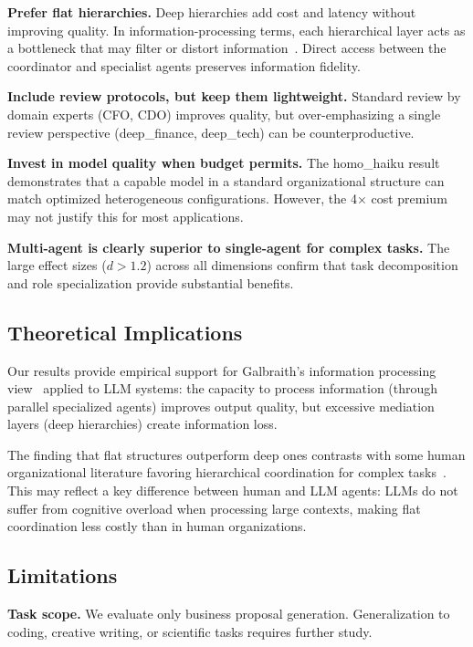 \documentclass[conference]{IEEEtran}
\begin{document}
\textbf{Prefer flat hierarchies.}
Deep hierarchies add cost and latency without improving quality.
In information-processing terms, each hierarchical layer acts as a bottleneck that may filter or distort information~\cite{galbraith1974designing}.
Direct access between the coordinator and specialist agents preserves information fidelity.

\textbf{Include review protocols, but keep them lightweight.}
Standard review by domain experts (CFO, CDO) improves quality, but over-emphasizing a single review perspective (deep\_finance, deep\_tech) can be counterproductive.

\textbf{Invest in model quality when budget permits.}
The homo\_haiku result demonstrates that a capable model in a standard organizational structure can match optimized heterogeneous configurations.
However, the 4$\times$ cost premium may not justify this for most applications.

\textbf{Multi-agent is clearly superior to single-agent for complex tasks.}
The large effect sizes ($d > 1.2$) across all dimensions confirm that task decomposition and role specialization provide substantial benefits.

\subsection{Theoretical Implications}

Our results provide empirical support for Galbraith's information processing view~\cite{galbraith1974designing} applied to LLM systems: the capacity to process information (through parallel specialized agents) improves output quality, but excessive mediation layers (deep hierarchies) create information loss.

The finding that flat structures outperform deep ones contrasts with some human organizational literature favoring hierarchical coordination for complex tasks~\cite{mintzberg1979structuring}.
This may reflect a key difference between human and LLM agents: LLMs do not suffer from cognitive overload when processing large contexts, making flat coordination less costly than in human organizations.

\subsection{Limitations}

\textbf{Task scope.}
We evaluate only business proposal generation.
Generalization to coding, creative writing, or scientific tasks requires further study.
\end{document}
